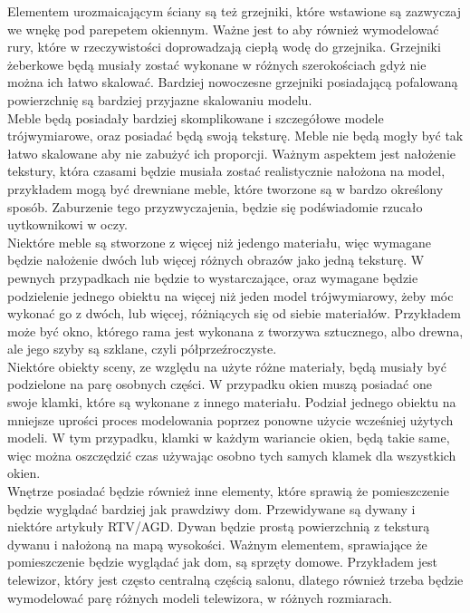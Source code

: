 \documentclass{article} %
\begin{document}
            Elementem urozmaicającym ściany są też grzejniki, które wstawione są zazwyczaj we wnękę pod parepetem okiennym. Ważne jest to aby również wymodelować rury, które w rzeczywistości doprowadzają ciepłą wodę do grzejnika. Grzejniki żeberkowe będą musiały zostać wykonane w różnych szerokościach gdyż nie można ich łatwo skalować. Bardziej nowoczesne grzejniki posiadającą pofalowaną powierzchnię są bardziej przyjazne skalowaniu modelu.
            \\
            
            Meble będą posiadały bardziej skomplikowane i szczegółowe modele trójwymiarowe, oraz posiadać będą swoją teksturę. Meble nie będą mogły być tak łatwo skalowane aby nie zabużyć ich proporcji. Ważnym aspektem jest nałożenie tekstury, która czasami będzie musiała zostać realistycznie nałożona na model, przykładem mogą być drewniane meble, które tworzone są w bardzo określony sposób. Zaburzenie tego przyzwyczajenia, będzie się podświadomie rzucało uytkownikowi w oczy.
            \\
            
            Niektóre meble są stworzone z więcej niż jedengo materiału, więc wymagane będzie nałożenie dwóch lub więcej różnych obrazów jako jedną teksturę. W pewnych przypadkach nie będzie to wystarczające, oraz wymagane będzie podzielenie jednego obiektu na więcej niż jeden model trójwymiarowy, żeby móc wykonać go z dwóch, lub więcej, różniących się od siebie materiałów. Przykładem może być okno, którego rama jest wykonana z tworzywa sztucznego, albo drewna, ale jego szyby są szklane, czyli półprzeźroczyste.
            \\
            
            Niektóre obiekty sceny, ze względu na użyte różne materiały, będą musiały być podzielone na parę osobnych części. W przypadku okien muszą posiadać one swoje klamki, które są wykonane z innego materiału. Podział jednego obiektu na mniejsze uprości proces modelowania poprzez ponowne użycie wcześniej użytych modeli. W tym przypadku, klamki w każdym wariancie okien, będą takie same, więc można oszczędzić czas używając osobno tych samych klamek dla wszystkich okien.
            \\
            
            Wnętrze posiadać będzie również inne elementy, które sprawią że pomieszczenie będzie wyglądać bardziej jak prawdziwy dom. Przewidywane są dywany i niektóre artykuły RTV/AGD. Dywan będzie prostą powierzchnią z teksturą dywanu i nałożoną na mapą wysokości. Ważnym elementem, sprawiające że pomieszczenie będzie wyglądać jak dom, są sprzęty domowe. Przykładem jest telewizor, który jest często centralną częścią salonu, dlatego również trzeba będzie wymodelować parę różnych modeli telewizora, w różnych rozmiarach. 
            \\
            
\end{document}
